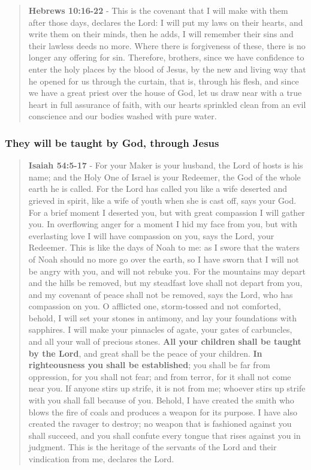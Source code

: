 \documentclass[11pt]{article}
\begin{document}
\begin{quote}
\textbf{Hebrews 10:16-22} - This is the covenant that I will make with them after those days, declares the Lord: I will put my laws on their hearts, and write them on their minds, then he adds, I will remember their sins and their lawless deeds no more.  Where there is forgiveness of these, there is no longer any offering for sin.  Therefore, brothers, since we have confidence to enter the holy places by the blood of Jesus, by the new and living way that he opened for us through the curtain, that is, through his flesh, and since we have a great priest over the house of God, let us draw near with a true heart in full assurance of faith, with our hearts sprinkled clean from an evil conscience and our bodies washed with pure water.
\end{quote}

\subsubsection{They will be taught by God, through Jesus}
\label{sec:org7b2b761}
\begin{quote}
\textbf{Isaiah 54:5-17} - For your Maker is your husband, the Lord of hosts is his name; and the Holy One of Israel is your Redeemer, the God of the whole earth he is called. For the Lord has called you like a wife deserted and grieved in spirit, like a wife of youth when she is cast off, says your God. For a brief moment I deserted you, but with great compassion I will gather you. In overflowing anger for a moment I hid my face from you, but with everlasting love I will have compassion on you, says the Lord, your Redeemer. This is like the days of Noah to me: as I swore that the waters of Noah should no more go over the earth, so I have sworn that I will not be angry with you, and will not rebuke you. For the mountains may depart and the hills be removed, but my steadfast love shall not depart from you, and my covenant of peace shall not be removed, says the Lord, who has compassion on you. O afflicted one, storm-tossed and not comforted, behold, I will set your stones in antimony, and lay your foundations with sapphires. I will make your pinnacles of agate, your gates of carbuncles, and all your wall of precious stones. \textbf{All your children shall be taught by the Lord}, and great shall be the peace of your children. \textbf{In righteousness you shall be established}; you shall be far from oppression, for you shall not fear; and from terror, for it shall not come near you. If anyone stirs up strife, it is not from me; whoever stirs up strife with you shall fall because of you. Behold, I have created the smith who blows the fire of coals and produces a weapon for its purpose. I have also created the ravager to destroy; no weapon that is fashioned against you shall succeed, and you shall confute every tongue that rises against you in judgment. This is the heritage of the servants of the Lord and their vindication from me, declares the Lord.
\end{quote}
\end{document}
